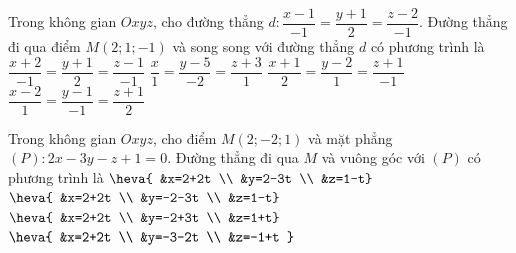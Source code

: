 \begin{ex}%
	Trong không gian $Oxyz$, cho đường thẳng $d\colon \dfrac{x-1}{-1}=\dfrac{y+1}{2}=\dfrac{z-2}{-1}$. Đường thẳng đi qua điểm $M(2; 1;-1)$ và song song với đường thẳng $d$ có phương trình là
	\choice
	{$\dfrac{x+2}{-1}=\dfrac{y+1}{2}=\dfrac{z-1}{-1}$}
	{\True $\dfrac{x}{1}=\dfrac{y-5}{-2}=\dfrac{z+3}{1}$}
	{$\dfrac{x+1}{2}=\dfrac{y-2}{1}=\dfrac{z+1}{-1}$}
	{$\dfrac{x-2}{1}=\dfrac{y-1}{-1}=\dfrac{z+1}{2}$}
\end{ex}
\begin{ex}%
	Trong không gian $Oxyz$, cho điểm $M(2;-2; 1)$ và mặt phẳng $(P)\colon 2x-3y-z+1=0$. Đường thẳng đi qua $M$ và vuông góc với $(P)$ có phương trình là
	\choice
	{$\heva{	&x=2+2t \\
			&y=2-3t \\
			&z=1-t}$}
	{\True $\heva{	&x=2+2t \\
			&y=-2-3t \\
			&z=1-t}$}
	{$\heva{	&x=2+2t \\
			&y=-2+3t \\
			&z=1+t}$}
	{$\heva{	&x=2+2t \\
			&y=-3-2t \\
			&z=-1+t	}$}
\end{ex}
